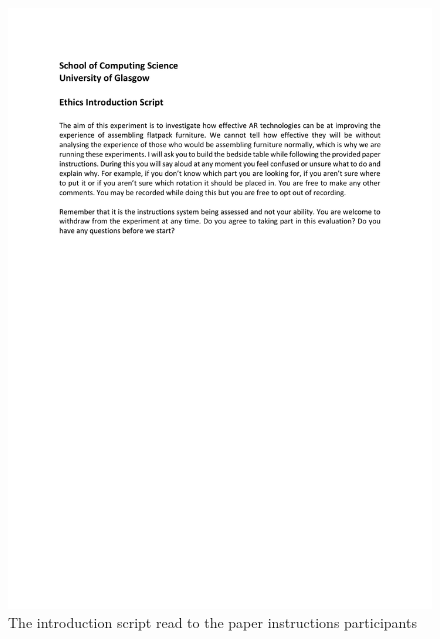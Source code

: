 \documentclass{l4proj}
\begin{document}
\begin{appendices}
\begin{figure}
    \centering
    \includegraphics[width=1\linewidth]{dissertation//images/introductionScriptPaper.pdf}
    \caption{The introduction script read to the paper instructions participants}
\end{figure}


\end{appendices}
\end{document}
